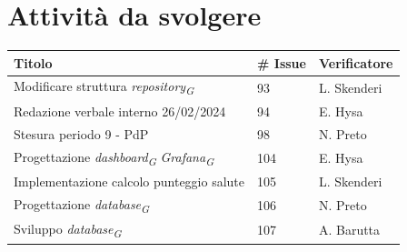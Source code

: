 \documentclass{article}
\begin{document}
\section{Attività da svolgere}
    \begin{center}
        \begin{tabular}{|C{7cm}|C{1,5cm}|C{3cm}|}
            \hline
            \textbf{Titolo} & \textbf{\# Issue} & \textbf{Verificatore} \\
            \hline\hline
            Modificare struttura \textit{repository}\textsubscript{\textit{G}} & 93 & L. Skenderi \\
            Redazione verbale interno 26/02/2024 & 94 & E. Hysa \\
            Stesura periodo 9 - PdP & 98 & N. Preto \\
            Progettazione \textit{dashboard}\textsubscript{\textit{G}} \textit{Grafana}\textsubscript{\textit{G}} & 104 & E. Hysa \\
            Implementazione calcolo punteggio salute & 105 & L. Skenderi \\
            Progettazione \textit{database}\textsubscript{\textit{G}} & 106 & N. Preto \\
            Sviluppo \textit{database}\textsubscript{\textit{G}} & 107 & A. Barutta \\
            \hline
        \end{tabular}
    \end{center}
\end{document}
